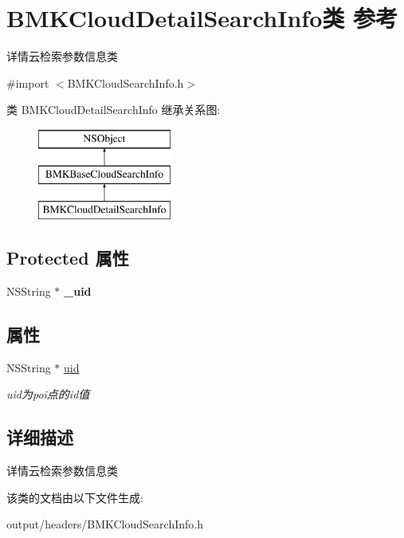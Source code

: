\hypertarget{interface_b_m_k_cloud_detail_search_info}{}\section{B\+M\+K\+Cloud\+Detail\+Search\+Info类 参考}
\label{interface_b_m_k_cloud_detail_search_info}


详情云检索参数信息类  




{\ttfamily \#import $<$B\+M\+K\+Cloud\+Search\+Info.\+h$>$}

类 B\+M\+K\+Cloud\+Detail\+Search\+Info 继承关系图\+:\begin{figure}[H]
\begin{center}
\leavevmode
\includegraphics[height=3.000000cm]{interface_b_m_k_cloud_detail_search_info}
\end{center}
\end{figure}
\subsection*{Protected 属性}
\begin{DoxyCompactItemize}
\item 
\hypertarget{interface_b_m_k_cloud_detail_search_info_af0561e1d6ce5656002bb7b576ac51b4f}{}N\+S\+String $\ast$ {\bfseries \+\_\+uid}\label{interface_b_m_k_cloud_detail_search_info_af0561e1d6ce5656002bb7b576ac51b4f}

\end{DoxyCompactItemize}
\subsection*{属性}
\begin{DoxyCompactItemize}
\item 
\hypertarget{interface_b_m_k_cloud_detail_search_info_ad553991a75b6d30409a9d3525bea9c52}{}N\+S\+String $\ast$ \hyperlink{interface_b_m_k_cloud_detail_search_info_ad553991a75b6d30409a9d3525bea9c52}{uid}\label{interface_b_m_k_cloud_detail_search_info_ad553991a75b6d30409a9d3525bea9c52}

\begin{DoxyCompactList}\small\item\em uid为poi点的id值 \end{DoxyCompactList}\end{DoxyCompactItemize}


\subsection{详细描述}
详情云检索参数信息类 

该类的文档由以下文件生成\+:\begin{DoxyCompactItemize}
\item 
output/headers/B\+M\+K\+Cloud\+Search\+Info.\+h\end{DoxyCompactItemize}
